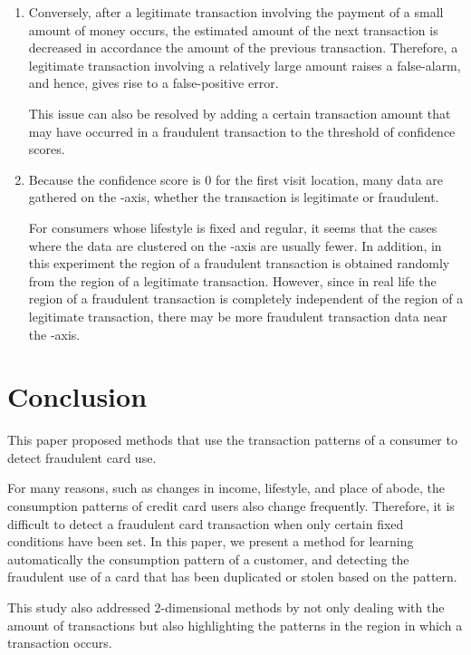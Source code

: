 \documentclass[final,authoryear,5p,times,twocolumn]{elsarticle}
\begin{document}
\begin{enumerate}
\item Conversely, after a legitimate transaction involving the payment of a small amount of money occurs, the estimated amount of the next transaction is decreased in accordance the amount of the previous transaction. Therefore, a legitimate transaction involving a relatively large amount raises a false-alarm, and hence, gives rise to a false-positive error.

This issue can also be resolved by adding a certain transaction amount that may have occurred in a fraudulent transaction to the threshold of confidence scores.

\item Because the confidence score is 0 for the first visit location, many data are gathered on the -axis, whether the transaction is legitimate or fraudulent.

For consumers whose lifestyle is fixed and regular, it seems that the cases where the data are clustered on the -axis are usually fewer. In addition, in this experiment the region of a fraudulent transaction is obtained randomly from the region of a legitimate transaction. However, since in real life the region of a fraudulent transaction is completely independent of the region of a legitimate transaction, there may be more fraudulent transaction data near the -axis.
\end{enumerate}

\section{Conclusion}
\label{section:Sec7}
This paper proposed methods that use the transaction patterns of a consumer to detect fraudulent card use.

For many reasons, such as changes in income, lifestyle, and place of abode, the consumption patterns of credit card users also change frequently. Therefore, it is difficult to detect a fraudulent card transaction when only certain fixed conditions have been set. In this paper, we present a method for learning automatically the consumption pattern of a customer, and detecting the fraudulent use of a card that has been duplicated or stolen based on the pattern.

This study also addressed 2-dimensional methods by not only dealing with the amount of transactions but also highlighting the patterns in the region in which a transaction occurs.





\end{document}
